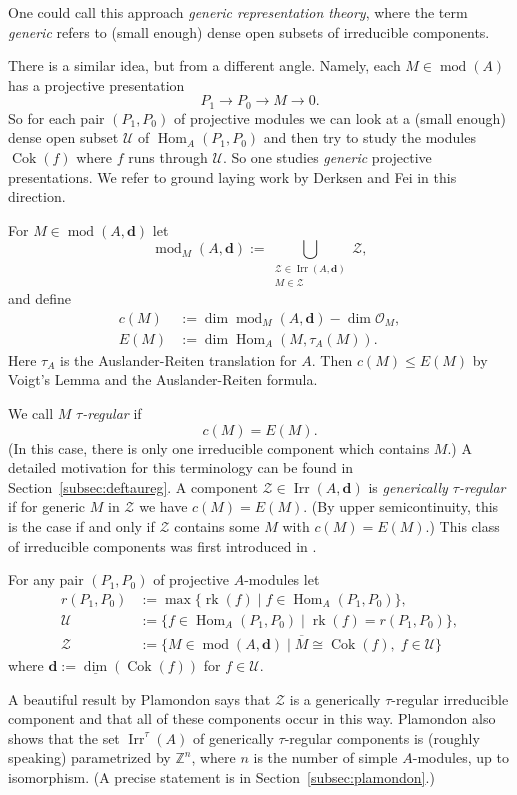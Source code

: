 \documentclass[12pt,reqno]{amsart}
\theoremstyle{definition}
\newcommand{\Z}{\mathbb{Z}}
\newcommand{\cO}{{\mathcal O}}
\newcommand{\bd}{\mathbf{d}}
\newcommand{\rk}{\operatorname{rk}}
\newcommand{\md}{\operatorname{mod}}
\newcommand{\dimv}{\underline{\dim}}
\newcommand{\Hom}{\operatorname{Hom}}
\newcommand{\Coker}{\operatorname{Cok}}
\newcommand{\irr}{\operatorname{Irr}}
\newcommand{\calU}{\mathcal{U}}
\newcommand{\calZ}{\mathcal{Z}}
\begin{document}
One could call this approach \emph{generic representation theory},
where the term \emph{generic} refers to (small enough) dense open subsets of
irreducible components.


There is a similar idea, but from a different angle.
Namely,
each $M \in \md(A)$ has a projective presentation
$$
P_1 \to P_0 \to M \to 0.
$$
So for each pair $(P_1,P_0)$ of projective modules we can look
at a (small enough) dense open subset $\calU$ of $\Hom_A(P_1,P_0)$ and
then try to study the modules $\Coker(f)$ where $f$ runs through $\calU$.
So one studies \emph{generic} projective presentations.
We refer to ground laying work by Derksen and Fei \cite{DF15} in this direction.

For $M \in \md(A,\bd)$ let
$$
\md_M(A,\bd) :=
\bigcup_{\substack{\calZ \in \irr(A,\bd)\\M \in \calZ}} \calZ,
$$
and define
\begin{align*}
c(M) &:= \dim \md_M(A,\bd) - \dim \cO_M,
\\
E(M) &:= \dim \Hom_A(M,\tau_A(M)).
\end{align*}
Here $\tau_A$ is the Auslander-Reiten translation for $A$.
Then $c(M) \le E(M)$ by Voigt's Lemma and the Auslander-Reiten
formula.

We call $M$ \emph{$\tau$-regular} if
$$
c(M) = E(M).
$$
(In this case, there is only one irreducible component which contains $M$.)
A detailed motivation for this terminology can be found in
Section~\ref{subsec:deftaureg}.
A component $\calZ \in \irr(A,\bd)$ is \emph{generically $\tau$-regular} if
for generic $M$ in $\calZ$ we have $c(M) = E(M)$.
(By upper semicontinuity, this is the case if and only if
$\calZ$ contains some $M$ with $c(M) = E(M)$.)
This class of irreducible components was first introduced in \cite{GLS12}.



For any pair $(P_1,P_0)$ of projective $A$-modules
let
\begin{align*}
r(P_1,P_0) &:= \max\{ \rk(f) \mid f \in \Hom_A(P_1,P_0) \},
\\
\calU &:=
\{  f \in \Hom_A(P_1,P_0) \mid \rk(f) = r(P_1,P_0) \},
\\
\calZ &:=
\overline{\{ M \in \md(A,\bd) \mid M \cong \Coker(f),\;
f \in \calU \}}
\end{align*}
where $\bd := \dimv(\Coker(f))$ for $f \in \calU$.

A beautiful result by
Plamondon \cite{P13} says that
$\calZ$
is a generically $\tau$-regular irreducible component
and that all of these components occur in this way.
Plamondon also shows that
the set $\irr^\tau(A)$ of generically $\tau$-regular components is (roughly speaking) parametrized by $\Z^n$, where
$n$ is the number of simple $A$-modules, up to isomorphism.
(A precise statement is in Section~\ref{subsec:plamondon}.)
\end{document}
